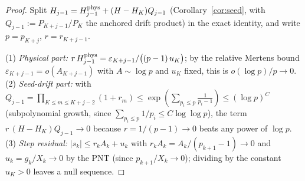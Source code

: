 \documentclass[11pt]{article}
\theoremstyle{remark}
\newcommand{\eps}{\varepsilon}
\begin{document}
\begin{proof}
Split $H_{j-1}=H^{\rm phys}_{j-1}+(H-H_K)Q_{j-1}$
(Corollary~\ref{cor:seed}, with $Q_{j-1}:=P_{K+j-1}/P_K$ the anchored
drift product) in the exact identity, and write $p=p_{K+j}$,
$r=r_{K+j-1}$.

(1) \emph{Physical part:} $r\,H^{\rm phys}_{j-1}
=\eps_{K+j-1}/\bigl((p-1)\,u_K\bigr)$; by the relative Mertens bound
$\eps_{K+j-1}=o(A_{K+j-1})$ with $A\sim\log p$ and $u_K$ fixed, this
is $o(\log p)/p\to0$. (2) \emph{Seed-drift part:} with
$Q_{j-1}=\prod_{K\le m\le K+j-2}(1+r_m)\le\exp(\sum_{p_i\le
p}\tfrac1{p_i-1})\le(\log p)^{C}$ (subpolynomial growth, since
$\sum_{p_i\le p}1/p_i\le C\log\log p$), the term
$r\,(H-H_K)Q_{j-1}\to0$ because $r=1/(p-1)\to0$ beats any power of
$\log p$. (3) \emph{Step residual:} $|s_k|\le r_kA_k+u_k$ with
$r_kA_k=A_k/(p_{k+1}-1)\to0$ and $u_k=g_k/X_k\to0$ by the PNT (since
$p_{k+1}/X_k\to0$); dividing by the constant $u_K>0$ leaves a null
sequence.
\end{proof}
\end{document}
